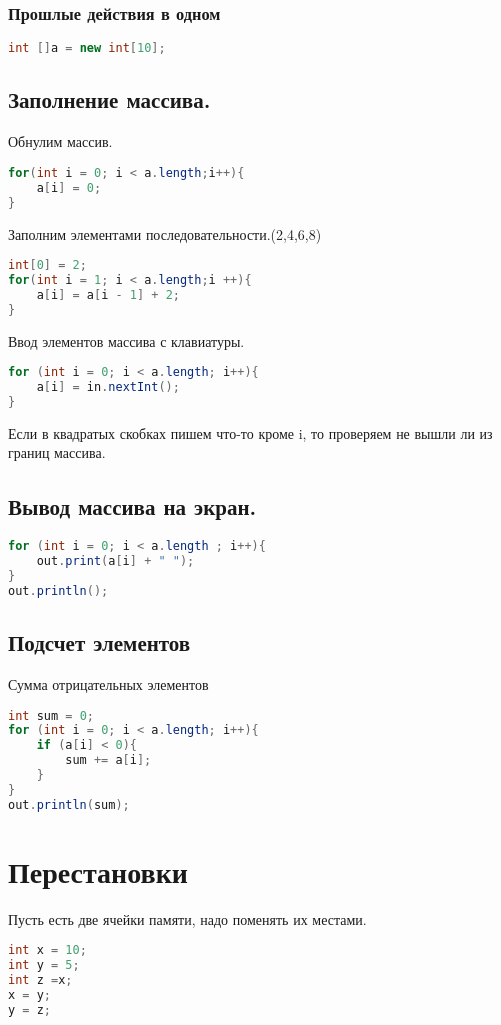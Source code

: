 \documentclass{scrartcl}
\begin{document}
\subsubsection{Прошлые действия в одном}
\begin{lstlisting}[language=Java] 
int []a = new int[10]; 
\end{lstlisting}
\subsection{Заполнение массива.}
Обнулим массив.
\begin{lstlisting}[language=Java] 
for(int i = 0; i < a.length;i++){
    a[i] = 0;
}
\end{lstlisting} 
Заполним элементами последовательности.(2,4,6,8)
\begin{lstlisting}[language=Java] 
int[0] = 2;
for(int i = 1; i < a.length;i ++){
    a[i] = a[i - 1] + 2;
} 
\end{lstlisting} 
Ввод элементов массива с клавиатуры.
\begin{lstlisting}[language=Java] 
for (int i = 0; i < a.length; i++){
    a[i] = in.nextInt();
}
\end{lstlisting} 
Если в квадратых скобках пишем что-то кроме i, то проверяем не вышли ли из границ массива.
\subsection{Вывод массива на экран.}
\begin{lstlisting}[language=Java] 
for (int i = 0; i < a.length ; i++){
    out.print(a[i] + " ");
} 
out.println();
\end{lstlisting} 
\subsection{Подсчет элементов}
Сумма отрицательных элементов
\begin{lstlisting}[language=Java] 
int sum = 0;
for (int i = 0; i < a.length; i++){
    if (a[i] < 0){
        sum += a[i];
    }
}
out.println(sum);
\end{lstlisting} 
\section{Перестановки}
Пусть есть две ячейки памяти, надо поменять их местами.
\begin{lstlisting}[language=Java] 
int x = 10;
int y = 5;
int z =x;
x = y;
y = z;
\end{lstlisting} 
\end{document}
